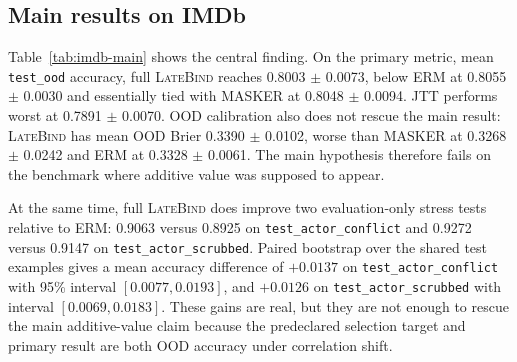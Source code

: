 \documentclass{article}
\newcommand{\LateBind}{\textsc{LateBind}}
\begin{document}
\subsection{Main results on IMDb}

Table~\ref{tab:imdb-main} shows the central finding. On the primary metric, mean \texttt{test\_ood} accuracy, full \LateBind{} reaches 0.8003 $\pm$ 0.0073, below ERM at 0.8055 $\pm$ 0.0030 and essentially tied with MASKER at 0.8048 $\pm$ 0.0094. JTT performs worst at 0.7891 $\pm$ 0.0070. OOD calibration also does not rescue the main result: \LateBind{} has mean OOD Brier 0.3390 $\pm$ 0.0102, worse than MASKER at 0.3268 $\pm$ 0.0242 and ERM at 0.3328 $\pm$ 0.0061. The main hypothesis therefore fails on the benchmark where additive value was supposed to appear.

At the same time, full \LateBind{} does improve two evaluation-only stress tests relative to ERM: 0.9063 versus 0.8925 on \texttt{test\_actor\_conflict} and 0.9272 versus 0.9147 on \texttt{test\_actor\_scrubbed}. Paired bootstrap over the shared test examples gives a mean accuracy difference of $+0.0137$ on \texttt{test\_actor\_conflict} with 95\% interval $[0.0077, 0.0193]$, and $+0.0126$ on \texttt{test\_actor\_scrubbed} with interval $[0.0069, 0.0183]$. These gains are real, but they are not enough to rescue the main additive-value claim because the predeclared selection target and primary result are both OOD accuracy under correlation shift.
\end{document}
